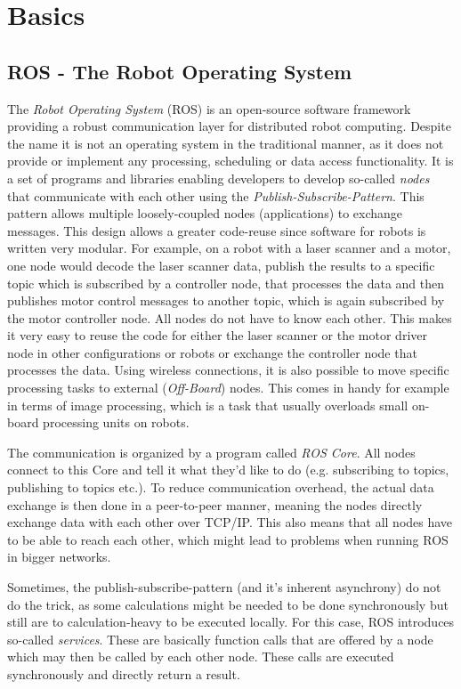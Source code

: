 \chapter{Basics}

\section{ROS - The Robot Operating System}

The \textit{Robot Operating System} (ROS) is an open-source software framework providing a robust communication layer for distributed robot computing\cite{ros:intro}. Despite the name it is not an operating system in the traditional manner, as it does not provide or implement any processing, scheduling or data access functionality. It is a set of programs and libraries enabling developers to develop so-called \textit{nodes} that communicate with each other using the \textit{Publish-Subscribe-Pattern}. %
This pattern allows multiple loosely-coupled nodes (applications) to exchange messages. This design allows a greater code-reuse since software for robots is written very modular. For example, on a robot with a laser scanner and a motor, one node would decode the laser scanner data, publish the results to a specific topic which is subscribed by a controller node, that processes the data and then publishes motor control messages to another topic, which is again subscribed by the motor controller node. All nodes do not have to know each other. This makes it very easy to reuse the code for either the laser scanner or the motor driver node in other configurations or robots or exchange the controller node that processes the data. Using wireless connections, it is also possible to move specific processing tasks to external (\textit{Off-Board}) nodes. This comes in handy for example in terms of image processing, which is a task that usually overloads small on-board processing units on robots.

The communication is organized by a program called \textit{ROS Core}. All nodes connect to this Core and tell it what they'd like to do (e.g. subscribing to topics, publishing to topics etc.). To reduce communication overhead, the actual data exchange is then done in a peer-to-peer manner, meaning the nodes directly exchange data with each other over TCP/IP. This also means that all nodes have to be able to reach each other, which might lead to problems when running ROS in bigger networks.

Sometimes, the publish-subscribe-pattern (and it's inherent asynchrony) do not do the trick, as some calculations might be needed to be done synchronously but still are to calculation-heavy to be executed locally. For this case, ROS introduces so-called \textit{services}. These are basically function calls that are offered by a node which may then be called by each other node. These calls are executed synchronously and directly return a result.

